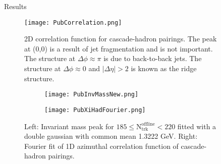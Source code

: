 \documentclass[final]{beamer}
\newlength{\sepwid}
\newlength{\onecolwid}
\newlength{\twocolwid}
\begin{document}
\begin{frame}[t]
\begin{columns}[t]
\begin{column}{\twocolwid}
\begin{columns}[t,totalwidth=\twocolwid]
\begin{column}{\onecolwid}
\begin{block}{Results}
\begin{figure}
\texttt{[image: PubCorrelation.png]}
\caption{2D correlation function for cascade-hadron pairings. The peak at (0,0)
is a result of jet fragmentation and is not important. The structure at $
\Delta\phi \approx \pi$ is due to back-to-back jets. The structure at $
\Delta\phi \approx 0$ and $ |\Delta\eta| > 2 $ is known as the ridge structure.}
\end{figure}

\begin{figure}
  \centering
  \begin{subfigure}[t]{0.45\textwidth}
    \texttt{[image: PubInvMassNew.png]}
  \end{subfigure}
  \begin{subfigure}[t]{0.45\textwidth}
    \texttt{[image: PubXiHadFourier.png]}
  \end{subfigure}
  \caption{
  Left: Invariant mass peak for $ 185 \leq
  \mathrm{N}_{\mathrm{trk}}^{\mathrm{offline}} < 220 $ fitted with a double
  gaussian with common mean 1.3222 GeV. Right: Fourier fit of 1D azimuthal
  correlation function of cascade-hadron pairings.
  }
\end{figure}

\end{block}


\end{column} %

\end{columns} %

\end{column} %

\begin{column}{\sepwid}\end{column} %

\begin{column}{\onecolwid} %



\end{column}
\end{columns}
\end{frame}
\end{document}
